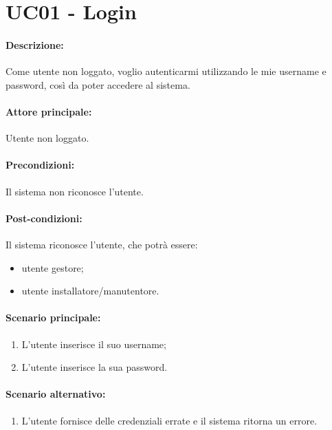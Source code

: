 \section{UC01 - Login}

\paragraph{Descrizione:}
Come utente non loggato, voglio autenticarmi utilizzando le mie username e password, così da poter accedere al sistema.

\paragraph{Attore principale:}
Utente non loggato.

\paragraph{Precondizioni:}
Il sistema non riconosce l'utente.

\paragraph{Post-condizioni:}
Il sistema riconosce l'utente, che potrà essere:
\begin{itemize}
    \item utente gestore;
    \item utente installatore/manutentore.
\end{itemize}

\paragraph{Scenario principale:}
\begin{enumerate}
    \item L'utente inserisce il suo username;
    \item L'utente inserisce la sua password.
\end{enumerate}

\paragraph{Scenario alternativo:}
\begin{enumerate}
    \item L'utente fornisce delle credenziali errate e il sistema ritorna un errore.
\end{enumerate}
